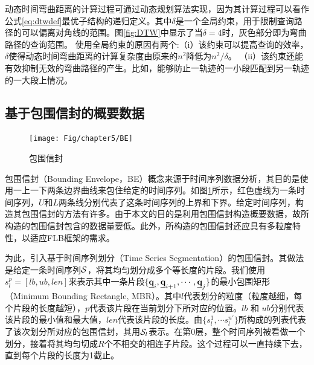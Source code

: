 动态时间弯曲距离的计算过程可通过动态规划算法实现，因为其计算过程可以看作公式\ref{eq:dtwdef}最优子结构的递归定义。其中$\delta$是一个全局约束，用于限制查询路径的可以偏离对角线的范围。图\ref{fig:DTW}中显示了当$\delta=4$时，灰色部分即为弯曲路径的查询范围。
使用全局约束的原因有两个:（i）该约束可以提高查询的效率，$\delta$使得动态时间弯曲距离的计算复杂度由原来的$n^2$降低为${n^2}/{\delta}$。
（ii）该约束还能有效抑制无效的弯曲路径的产生。比如，能够防止一轨迹的一小段匹配到另一轨迹的一大段上情况。




\subsection{基于包围信封的概要数据}\label{sec-c5-BE}
\begin{figure}[t]
	\centering
	\texttt{[image: Fig/chapter5/BE]}
	\caption{包围信封}
	\label{fig:BE}
\end{figure}
包围信封（Bounding Envelope，BE）概念来源于时间序列数据分析，其目的是使用一上一下两条边界曲线来包住给定的时间序列。如图\ref{fig:BE}所示，红色虚线为一条时间序列，$U$和$L$两条线分别代表了这条时间序列的上界和下界。给定时间序列，构造其包围信封的方法有许多。由于本文的目的是利用包围信封构造概要数据，故所构造的包围信封包含的数据量要低。此外，所构造的包围信封还应具有多粒度特性，以适应FLB框架的需求。

为此，引入基于时间序列划分（Time Series Segmentation）的包围信封。其做法是给定一条时间序列$\cal S$，将其均匀划分成多个等长度的片段。我们使用$s_{l}^{p}= {[lb, ub, len]}$来表示其中一条片段$\{\emph{{\textbf{q}}}_{i}, \emph{{\textbf{q}}}_{i+1}, \cdots, \emph{{\textbf{q}}}_{j} \}$的最小包围矩形（Minimum Bounding Rectangle, MBR）。其中$l$代表划分的粒度（粒度越细，每个片段的长度越短），$p$代表该片段在当前划分下所对应的位置。$lb$ 和 $ub$分别代表该片段的最小值和最大值，$len$代表该片段的长度。由$\{s_{l}^{1}, \cdots s_{l}^{n'}\}$所构成的列表代表了该次划分所对应的包围信封，其用${\cal S}_{l}$表示。在第0层，整个时间序列被看做一个划分，接着将其均匀切成$R$个不相交的相连子片段。这个过程可以一直持续下去，直到每个片段的长度为1截止。


